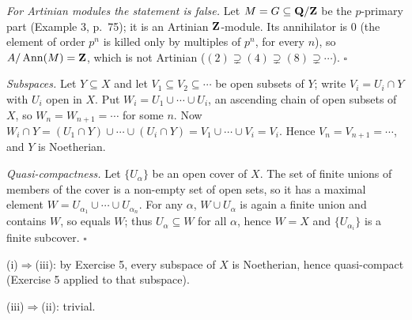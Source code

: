 \documentclass[11pt]{article}
\begin{document}
\emph{For Artinian modules the statement is false.} Let $M=G\subseteq\mathbf Q/\mathbf Z$ be the $p$-primary part (Example 3, p.~75); it is an Artinian $\mathbf Z$-module. Its annihilator is $0$ (the element of order $p^n$ is killed only by multiples of $p^n$, for every $n$), so $A/\operatorname{Ann}(M)=\mathbf Z$, which is not Artinian ($(2)\supsetneq(4)\supsetneq(8)\supsetneq\cdots$). \hfill$\square$

\pf
\emph{Subspaces.} Let $Y\subseteq X$ and let $V_1\subseteq V_2\subseteq\cdots$ be open subsets of $Y$; write $V_i=U_i\cap Y$ with $U_i$ open in $X$. Put $W_i=U_1\cup\cdots\cup U_i$, an ascending chain of open subsets of $X$, so $W_n=W_{n+1}=\cdots$ for some $n$. Now $W_i\cap Y=(U_1\cap Y)\cup\cdots\cup(U_i\cap Y)=V_1\cup\cdots\cup V_i=V_i$. Hence $V_n=V_{n+1}=\cdots$, and $Y$ is Noetherian.

\emph{Quasi-compactness.} Let $\{U_\alpha\}$ be an open cover of $X$. The set of finite unions of members of the cover is a non-empty set of open sets, so it has a maximal element $W=U_{\alpha_1}\cup\cdots\cup U_{\alpha_n}$. For any $\alpha$, $W\cup U_\alpha$ is again a finite union and contains $W$, so equals $W$; thus $U_\alpha\subseteq W$ for all $\alpha$, hence $W=X$ and $\{U_{\alpha_i}\}$ is a finite subcover. \hfill$\square$

\pf
(i)$\Rightarrow$(iii): by Exercise 5, every subspace of $X$ is Noetherian, hence quasi-compact (Exercise 5 applied to that subspace).

(iii)$\Rightarrow$(ii): trivial.
\end{document}
